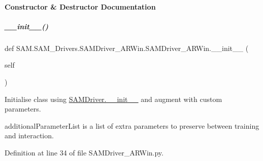 \paragraph{Constructor \& Destructor Documentation}
\mbox{\label{group__icubclient__SAM__Drivers_a1d8d40aaf3d8688bb50f784c19615368}} 
\subparagraph{\texorpdfstring{\+\_\+\+\_\+init\+\_\+\+\_\+()}{\_\_init\_\_()}}
{\footnotesize\ttfamily def S\+A\+M.\+S\+A\+M\+\_\+\+Drivers.\+S\+A\+M\+Driver\+\_\+\+A\+R\+Win.\+S\+A\+M\+Driver\+\_\+\+A\+R\+Win.\+\_\+\+\_\+init\+\_\+\+\_\+ (\begin{DoxyParamCaption}\item[{}]{self }\end{DoxyParamCaption})}



Initialise class using \hyperlink{group__icubclient__SAM__Drivers_gac35ec3eea80d1fb5704758a9c53267a1}{S\+A\+M\+Driver.\+\_\+\+\_\+init\+\_\+\+\_\+} and augment with custom parameters. 

additional\+Parameter\+List is a list of extra parameters to preserve between training and interaction. 

Definition at line 34 of file S\+A\+M\+Driver\+\_\+\+A\+R\+Win.\+py.



